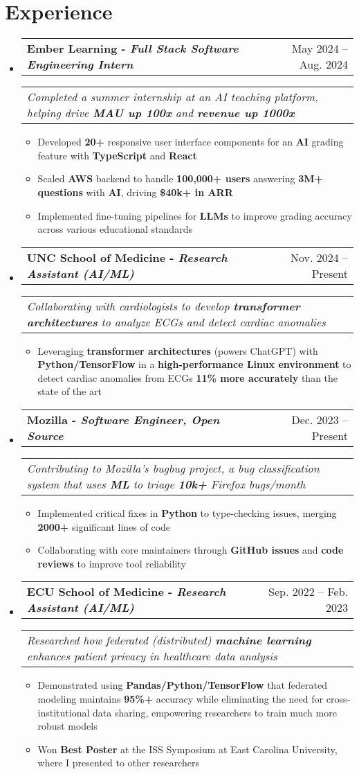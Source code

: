 \documentclass[letterpaper,11pt]{article}
\makeatletter
\newcommand{\resumeItem}[1]{
  \item\small{
    {#1 \vspace{-2pt}}}
}
\newcommand{\resumeSubheading}[3]{
  \vspace{-2pt}\item
    \begin{tabular*}{0.97\textwidth}[t]{l@{\extracolsep{\fill}}r}
      \textbf{#1} & #2 \\
    \end{tabular*}
    \begin{tabular*}{0.97\textwidth}[t]{l}
      \textit{\small#3} \\
    \end{tabular*}\vspace{-7pt}
}
\newcommand{\resumeSubHeadingListStart}{\begin{itemize}[leftmargin=0.15in, label={}]}
\newcommand{\resumeSubHeadingListEnd}{\end{itemize}}
\newcommand{\resumeItemListStart}{\begin{itemize}}
\newcommand{\resumeItemListEnd}{\end{itemize}\vspace{-5pt}}
\makeatother
\begin{document}
\section{Experience}
  \resumeSubHeadingListStart
    \resumeSubheading
      {\textbf{Ember Learning} - \textit{Full Stack Software Engineering Intern}}{May 2024 -- Aug. 2024}
      {Completed a summer internship at an AI teaching platform, helping drive \textbf{MAU up 100x} and \textbf{revenue up 1000x}}
      \resumeItemListStart
        \resumeItem{Developed \textbf{20+} responsive user interface components for an \textbf{AI} grading feature with \textbf{TypeScript} and \textbf{React}}
        \resumeItem{Scaled \textbf{AWS} backend to handle \textbf{100,000+ users} answering \textbf{3M+ questions} with \textbf{AI}, driving \textbf{\$40k+ in ARR}}
        \resumeItem{Implemented fine-tuning pipelines for \textbf{LLMs} to improve grading accuracy across various educational standards}
      \resumeItemListEnd
      \resumeSubheading
      {\textbf{UNC School of Medicine} - \textit{Research Assistant (AI/ML)}}{ Nov. 2024 -- Present}
      {Collaborating with cardiologists to develop \textbf{transformer architectures} to analyze ECGs and detect cardiac anomalies}
      \resumeItemListStart
        \resumeItem{Leveraging \textbf{transformer architectures} (powers ChatGPT) with \textbf{Python/TensorFlow} in a \textbf{high-performance Linux environment} to detect cardiac anomalies from ECGs \textbf{11\% more accurately} than the state of the art}
      \resumeItemListEnd
      \resumeSubheading
      {\textbf{Mozilla} - \textit{Software Engineer, Open Source}}{Dec. 2023 -- Present}
      {Contributing to Mozilla's bugbug project, a bug classification system that uses \textbf{ML} to triage \textbf{10k+} Firefox bugs/month} 
      \resumeItemListStart
        \resumeItem{Implemented critical fixes in \textbf{Python} to type-checking issues, merging \textbf{2000+} significant lines of code}
        \resumeItem{Collaborating with core maintainers through \textbf{GitHub issues} and \textbf{code reviews} to improve tool reliability}
      \resumeItemListEnd
      \resumeSubheading
      {\textbf{ECU School of Medicine} - \textit{Research Assistant (AI/ML)}}{Sep. 2022 -- Feb. 2023}
      {Researched how federated (distributed) \textbf{machine learning} enhances patient privacy in healthcare data analysis}
      \resumeItemListStart
        \resumeItem{Demonstrated using \textbf{Pandas/Python/TensorFlow} that federated modeling maintains \textbf{95\%+} accuracy while eliminating the need for cross-institutional data sharing, empowering researchers to train much more robust models}
        \resumeItem{Won \textbf{Best Poster} at the ISS Symposium at East Carolina University, where I presented to other researchers}
      \resumeItemListEnd
  \resumeSubHeadingListEnd
\end{document}
